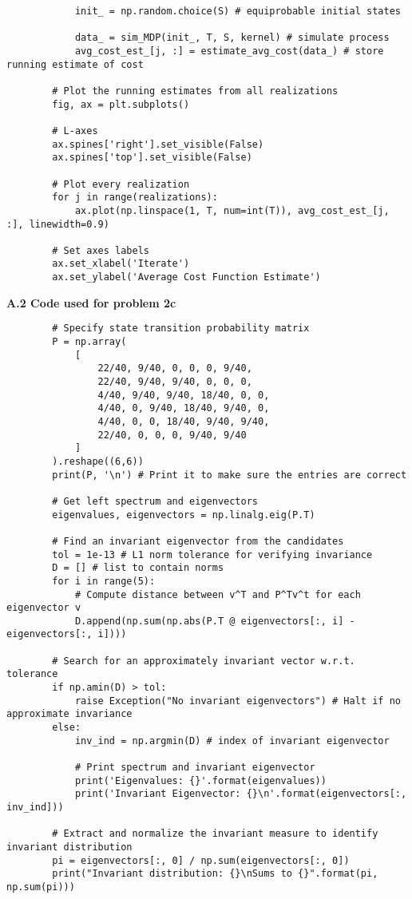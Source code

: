 \documentclass[11pt, letterpaper]{article}
\begin{document}
\begin{verbatim}
            init_ = np.random.choice(S) # equiprobable initial states

            data_ = sim_MDP(init_, T, S, kernel) # simulate process
            avg_cost_est_[j, :] = estimate_avg_cost(data_) # store running estimate of cost

        # Plot the running estimates from all realizations
        fig, ax = plt.subplots()

        # L-axes
        ax.spines['right'].set_visible(False)
        ax.spines['top'].set_visible(False)

        # Plot every realization
        for j in range(realizations):
            ax.plot(np.linspace(1, T, num=int(T)), avg_cost_est_[j, :], linewidth=0.9)

        # Set axes labels
        ax.set_xlabel('Iterate')
        ax.set_ylabel('Average Cost Function Estimate')
    \end{verbatim}
    {\bf A.2 Code used for problem 2c}
    \begin{verbatim}
        # Specify state transition probability matrix
        P = np.array(
            [
                22/40, 9/40, 0, 0, 0, 9/40,
                22/40, 9/40, 9/40, 0, 0, 0,
                4/40, 9/40, 9/40, 18/40, 0, 0,
                4/40, 0, 9/40, 18/40, 9/40, 0,
                4/40, 0, 0, 18/40, 9/40, 9/40,
                22/40, 0, 0, 0, 9/40, 9/40
            ]
        ).reshape((6,6))
        print(P, '\n') # Print it to make sure the entries are correct

        # Get left spectrum and eigenvectors
        eigenvalues, eigenvectors = np.linalg.eig(P.T)

        # Find an invariant eigenvector from the candidates
        tol = 1e-13 # L1 norm tolerance for verifying invariance
        D = [] # list to contain norms
        for i in range(5):
            # Compute distance between v^T and P^Tv^t for each eigenvector v
            D.append(np.sum(np.abs(P.T @ eigenvectors[:, i] - eigenvectors[:, i])))

        # Search for an approximately invariant vector w.r.t. tolerance
        if np.amin(D) > tol:
            raise Exception("No invariant eigenvectors") # Halt if no approximate invariance
        else:
            inv_ind = np.argmin(D) # index of invariant eigenvector

            # Print spectrum and invariant eigenvector
            print('Eigenvalues: {}'.format(eigenvalues))
            print('Invariant Eigenvector: {}\n'.format(eigenvectors[:, inv_ind]))

        # Extract and normalize the invariant measure to identify invariant distribution
        pi = eigenvectors[:, 0] / np.sum(eigenvectors[:, 0])
        print("Invariant distribution: {}\nSums to {}".format(pi, np.sum(pi)))
    \end{verbatim}
\end{document}
